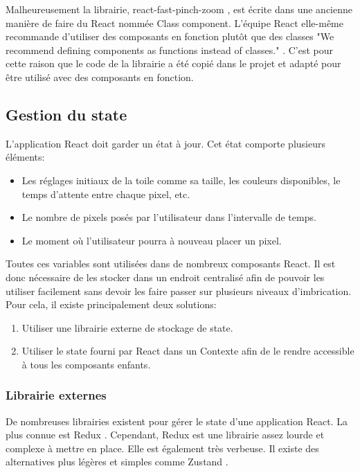 Malheureusement la librairie, react-fast-pinch-zoom \cite{react-fast-pinch-zoom}, est écrite dans une ancienne manière de faire du React nommée Class component. L'équipe React elle-même recommande d'utiliser des composants en fonction plutôt que des classes "We recommend defining components as functions instead of classes." \cite{react-class-component}. C'est pour cette raison que le code de la librairie a été copié dans le projet et adapté pour être utilisé avec des composants en fonction.

\subsection{Gestion du state}

L'application React doit garder un état à jour. Cet état comporte plusieurs éléments:

\begin{itemize}
  \item Les réglages initiaux de la toile comme sa taille, les couleurs disponibles, le temps d'attente entre chaque pixel, etc.
  \item Le nombre de pixels posés par l'utilisateur dans l'intervalle de temps.
  \item Le moment où l'utilisateur pourra à nouveau placer un pixel.
\end{itemize}

Toutes ces variables sont utilisées dans de nombreux composants React. Il est donc nécessaire de les stocker dans un endroit centralisé afin de pouvoir les utiliser facilement sans devoir les faire passer sur plusieurs niveaux d'imbrication. Pour cela, il existe principalement deux solutions:

\begin{enumerate}
  \item Utiliser une librairie externe de stockage de state.
  \item Utiliser le state fourni par React dans un Contexte \cite{react-context} afin de le rendre accessible à tous les composants enfants.
\end{enumerate}

\subsubsection{Librairie externes}

De nombreuses librairies existent pour gérer le state d'une application React. La plus connue est Redux \cite{react-redux}. Cependant, Redux est une librairie assez lourde et complexe à mettre en place. Elle est également très verbeuse. Il existe des alternatives plus légères et simples comme Zustand \cite{zustand}.

